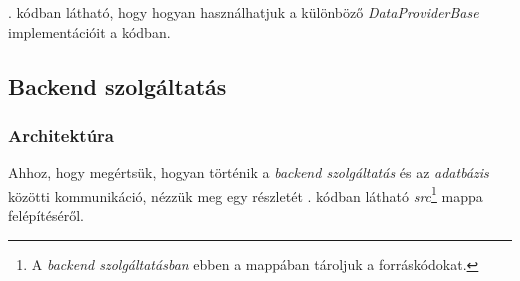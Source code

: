 \documentclass[
]{thesis-ekf}
\theoremstyle{definition}
\theoremstyle{remark}
\begin{document}
. kódban látható, hogy hogyan használhatjuk a különböző \emph{DataProviderBase} implementációit a kódban.



\subsection{Backend szolgáltatás}
\subsubsection{Architektúra}
\label{subsubsec-backend-architektura}
Ahhoz, hogy megértsük, hogyan történik a \emph{backend szolgáltatás} és az \emph{adatbázis} közötti kommunikáció, nézzük meg egy részletét . kódban látható \emph{src}\footnote{A \emph{backend szolgáltatásban} ebben a mappában tároljuk a forráskódokat.} mappa felépítéséről.


\end{document}
